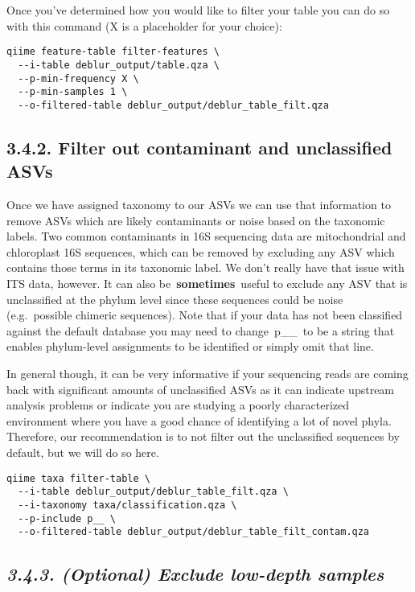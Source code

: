 \documentclass[
]{book}
\begin{document}
Once you've determined how you would like to filter your table you can do so with this command (X is a placeholder for your choice):

\begin{verbatim}
qiime feature-table filter-features \
  --i-table deblur_output/table.qza \
  --p-min-frequency X \
  --p-min-samples 1 \
  --o-filtered-table deblur_output/deblur_table_filt.qza
\end{verbatim}

\subsection{3.4.2. Filter out contaminant and unclassified ASVs}\label{filter-out-contaminant-and-unclassified-asvs-2}

Once we have assigned taxonomy to our ASVs we can use that information to remove ASVs which are likely contaminants or noise based on the taxonomic labels. Two common contaminants in 16S sequencing data are mitochondrial and chloroplast 16S sequences, which can be removed by excluding any ASV which contains those terms in its taxonomic label. We don't really have that issue with ITS data, however. It can also be~\textbf{sometimes}~useful to exclude any ASV that is unclassified at the phylum level since these sequences could be noise (e.g.~possible chimeric sequences). Note that if your data has not been classified against the default database you may need to change~p\_\_~to be a string that enables phylum-level assignments to be identified or simply omit that line.

In general though, it can be very informative if your sequencing reads are coming back with significant amounts of unclassified ASVs as it can indicate upstream analysis problems or indicate you are studying a poorly characterized environment where you have a good chance of identifying a lot of novel phyla. Therefore, our recommendation is to not filter out the unclassified sequences by default, but we will do so here.

\begin{verbatim}
qiime taxa filter-table \
  --i-table deblur_output/deblur_table_filt.qza \
  --i-taxonomy taxa/classification.qza \
  --p-include p__ \
  --o-filtered-table deblur_output/deblur_table_filt_contam.qza
\end{verbatim}

\subsection{\texorpdfstring{\emph{3.4.3. (Optional) Exclude low-depth samples}}{3.4.3. (Optional) Exclude low-depth samples}}\label{optional-exclude-low-depth-samples-2}
\end{document}
